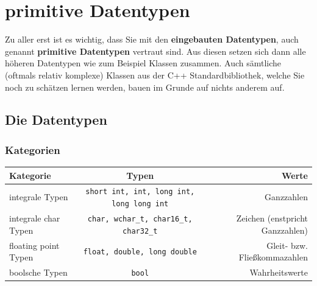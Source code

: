 \documentclass[a4paper]{report}
\begin{document}
\section{primitive Datentypen}
Zu aller erst ist es wichtig, dass Sie mit den \textbf{eingebauten Datentypen}, auch genannt \textbf{primitive Datentypen} vertraut sind. Aus diesen setzen sich dann alle höheren Datentypen wie zum Beispiel Klassen zusammen. Auch sämtliche (oftmals relativ komplexe) Klassen aus der C++ Standardbibliothek, welche Sie noch zu schätzen lernen werden, bauen im Grunde auf nichts anderem auf.

\subsection{Die Datentypen}

\subsubsection{Kategorien}
 \begin{center}
\begin{tabular}{|l|c|r|}
	\hline
	\textbf{Kategorie} & \textbf{Typen} & \textbf{Werte}\\ \hline 
	integrale Typen & \texttt{short int, int, long int, long long int} & Ganzzahlen \\ 
	integrale char Typen & \texttt{char, wchar\_t, char16\_t, char32\_t} & Zeichen (enstpricht Ganzzahlen) \\
	floating point Typen & \texttt{float, double, long double} & Gleit- bzw. Fließkommazahlen \\
	boolsche Typen & \texttt{bool} & Wahrheitswerte \\ \hline
\end{tabular}
\end{center}
\end{document}
